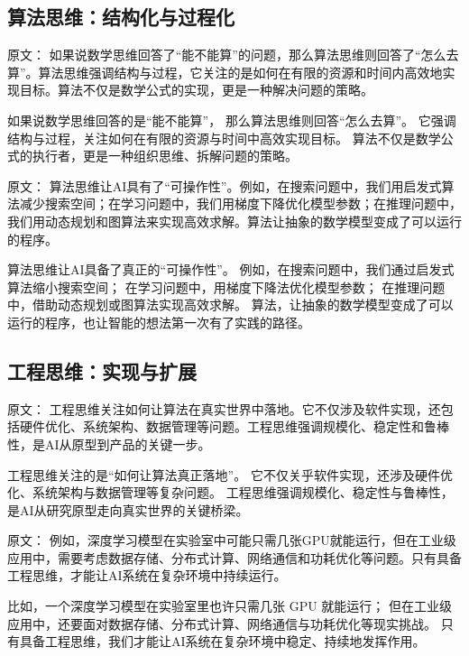 \subsection{算法思维：结构化与过程化}

原文：
如果说数学思维回答了“能不能算”的问题，那么算法思维则回答了“怎么去算”。算法思维强调结构与过程，它关注的是如何在有限的资源和时间内高效地实现目标。算法不仅是数学公式的实现，更是一种解决问题的策略。

如果说数学思维回答的是“能不能算”，  
那么算法思维则回答“怎么去算”。  
它强调结构与过程，关注如何在有限的资源与时间中高效实现目标。  
算法不仅是数学公式的执行者，更是一种组织思维、拆解问题的策略。

原文：
算法思维让AI具有了“可操作性”。例如，在搜索问题中，我们用启发式算法减少搜索空间；在学习问题中，我们用梯度下降优化模型参数；在推理问题中，我们用动态规划和图算法来实现高效求解。算法让抽象的数学模型变成了可以运行的程序。

算法思维让AI具备了真正的“可操作性”。  
例如，在搜索问题中，我们通过启发式算法缩小搜索空间；  
在学习问题中，用梯度下降法优化模型参数；  
在推理问题中，借助动态规划或图算法实现高效求解。  
算法，让抽象的数学模型变成了可以运行的程序，也让智能的想法第一次有了实践的路径。

\subsection{工程思维：实现与扩展}

原文：
工程思维关注如何让算法在真实世界中落地。它不仅涉及软件实现，还包括硬件优化、系统架构、数据管理等问题。工程思维强调规模化、稳定性和鲁棒性，是AI从原型到产品的关键一步。

工程思维关注的是“如何让算法真正落地”。  
它不仅关乎软件实现，还涉及硬件优化、系统架构与数据管理等复杂问题。  
工程思维强调规模化、稳定性与鲁棒性，是AI从研究原型走向真实世界的关键桥梁。

原文：
例如，深度学习模型在实验室中可能只需几张GPU就能运行，但在工业级应用中，需要考虑数据存储、分布式计算、网络通信和功耗优化等问题。只有具备工程思维，才能让AI系统在复杂环境中持续运行。

比如，一个深度学习模型在实验室里也许只需几张 GPU 就能运行；  
但在工业级应用中，还要面对数据存储、分布式计算、网络通信与功耗优化等现实挑战。  
只有具备工程思维，我们才能让AI系统在复杂环境中稳定、持续地发挥作用。

